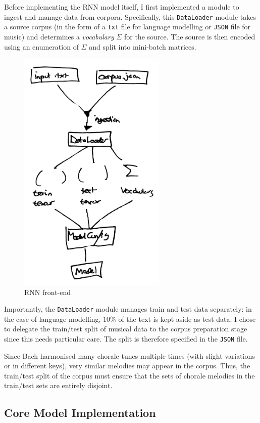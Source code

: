 \documentclass[12pt,a4paper,twoside,openright]{report}
\begin{document}
Before implementing the RNN model itself, I first implemented a module to ingest
and manage data from corpora. Specifically, this \texttt{DataLoader} module
takes a source corpus (in the form of a \texttt{txt} file for language modelling
or \texttt{JSON} file for music) and determines a \emph{vocabulary} $\Sigma$ for
the source. The source is then encoded using an enumeration of $\Sigma$ and
split into mini-batch matrices. 

\begin{figure}[H]
\centering
\includegraphics[width=200pt]{figs/rnn_frontend.jpg}
\caption{RNN front-end}
\label{fig:rnn-frontend}
\end{figure}

Importantly, the \texttt{DataLoader} module manages train and test data
separately: in the case of language modelling, $10\%$ of the text is kept aside
as test data. I chose to delegate the train/test split of musical data
to the corpus preparation stage since this needs particular care. The split is
therefore specified in the \texttt{JSON} file. 

Since Bach harmonised many chorale tunes multiple times (with slight variations
or in different keys), very similar melodies may appear in the corpus. Thus, the
train/test split of the corpus must ensure that the sets of chorale melodies in
the train/test sets are entirely disjoint.

\subsection{Core Model Implementation}
\end{document}
